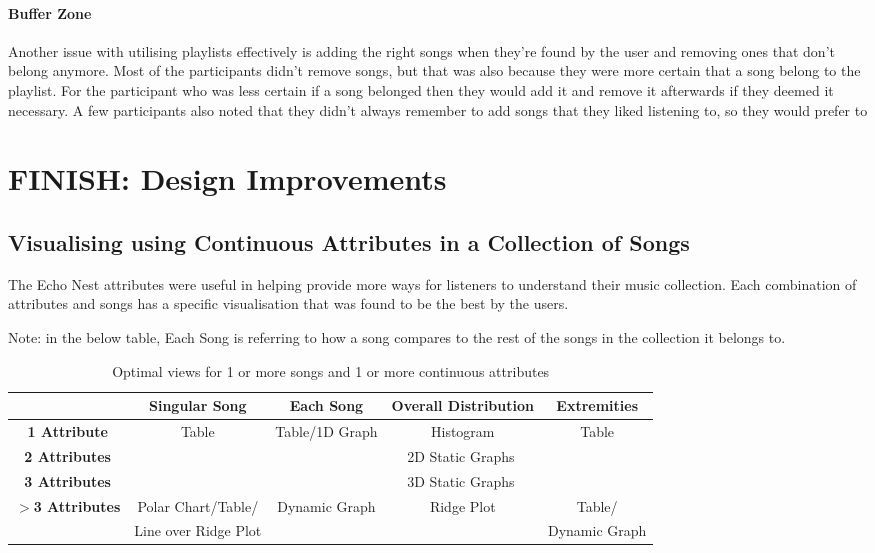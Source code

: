 \paragraph{Buffer Zone}
Another issue with utilising playlists effectively is adding the right songs when they're found by the user and removing ones that don't belong anymore. Most of the participants didn't remove songs, but that was also because they were more certain that a song belong to the playlist. For the participant who was less certain if a song belonged then they would add it and remove it afterwards if they deemed it necessary. A few participants also noted that they didn't always remember to add songs that they liked listening to, so they would prefer to 

\section{FINISH: Design Improvements}
\subsection{Visualising using Continuous Attributes in a Collection of Songs}
The Echo Nest attributes were useful in helping provide more ways for listeners to understand their music collection. Each combination of attributes and songs has a specific visualisation that was found to be the best by the users.

Note: in the below table, Each Song is referring to how a song compares to the rest of the songs in the collection it belongs to.

\begin{longtable}[c]{| c | c | c | c | c|}
    \caption{Optimal views for 1 or more songs and 1 or more continuous attributes} \\
    \toprule
    & \textbf{Singular Song}
    & \textbf{Each Song} %
    & \textbf{Overall Distribution}
    & \textbf{Extremities} %
    \\ \midrule \endhead

    \textbf{1 Attribute} & \multirow{3}{*}{Table} & Table/1D Graph & Histogram & Table \\*
    \cmidrule{1-1}\cmidrule{3-5}
    \textbf{2 Attributes} & & \multicolumn{3}{c|}{2D Static Graphs} \\*
    \cmidrule{1-1}\cmidrule{3-5}
    \textbf{3 Attributes} & & \multicolumn{3}{c|}{3D Static Graphs} \\*
    \midrule
    \multirow{2}{*}{\textbf{\(>\)3 Attributes}} & Polar Chart/Table/ & \multirow{2}{*}{Dynamic Graph} & \multirow{2}{*}{Ridge Plot} & Table/\\*
    & Line over Ridge Plot & & & Dynamic Graph \\*
    \midrule
\end{longtable}

